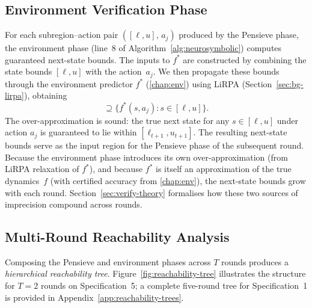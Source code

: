 \documentclass[thesis]{uofithesis} %
\begin{document}
    \subsection{Environment Verification Phase}
    \label{sec:verify-env-phase}

    For each subregion--action pair $([\ell, u],\, a_j)$ produced by the
    Pensieve phase, the environment phase (line~8 of
    Algorithm~\ref{alg:neurosymbolic}) computes guaranteed next-state
    bounds.  The inputs to $f^{\ast}$ are constructed by combining the
    state bounds $[\ell, u]$ with the action~$a_j$.  We then
    propagate these bounds through the environment predictor $f^{\ast}$
    (\ref{chap:env}) using LiRPA (Section~\ref{sec:bg-lirpa}),
    obtaining
    \begin{equation}
        [\ell_{t+1},\, u_{t+1}]
        \supseteq \bigl\{f^{\ast}(s, a_j) : s \in [\ell, u]\bigr\}.
        \label{eq:env-bounds}
    \end{equation}
    The over-approximation is sound: the true next state for any
    $s \in [\ell, u]$ under action $a_j$ is guaranteed to lie within
    $[\ell_{t+1}, u_{t+1}]$.  The resulting next-state bounds serve as the
    input region for the Pensieve phase of the subsequent round.  Because
    the environment phase introduces its own over-approximation (from LiRPA
    relaxation of $f^{\ast}$), and because $f^{\ast}$ is itself an
    approximation of the true dynamics~$f$ (with certified accuracy from
    \ref{chap:env}), the next-state bounds grow with each round.
    Section~\ref{sec:verify-theory} formalises how these two sources of
    imprecision compound across rounds.


    \subsection{Multi-Round Reachability Analysis}
    \label{sec:reachability-tree}

    Composing the Pensieve and environment phases across $T$ rounds
    produces a \emph{hierarchical reachability tree}.
    Figure~\ref{fig:reachability-tree} illustrates the structure for $T = 2$ rounds on Specification~5; a complete five-round tree for Specification~1 is provided in Appendix~\ref{app:reachability-trees}.
\end{document}
